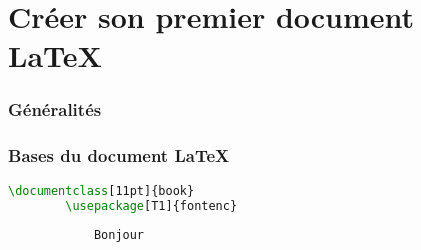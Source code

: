 \section{Créer son premier document \LaTeX}

\begin{frame}[containsverbatim]
    \frametitle{Généralités}
    \encours
    \begin{comment}
        Extension de fichier
        Compilation
        Ecriture
        balises, ...
    \end{comment}
\end{frame}

\begin{frame}[containsverbatim]
    \frametitle{Bases du document \LaTeX}
    \begin{lstlisting}[language=TeX, caption=Contenu minimal d'un document \texttt{.tex}]
        \documentclass[11pt]{book}
        \usepackage[T1]{fontenc}
        
            Bonjour
        
    \end{lstlisting}
\end{frame}

